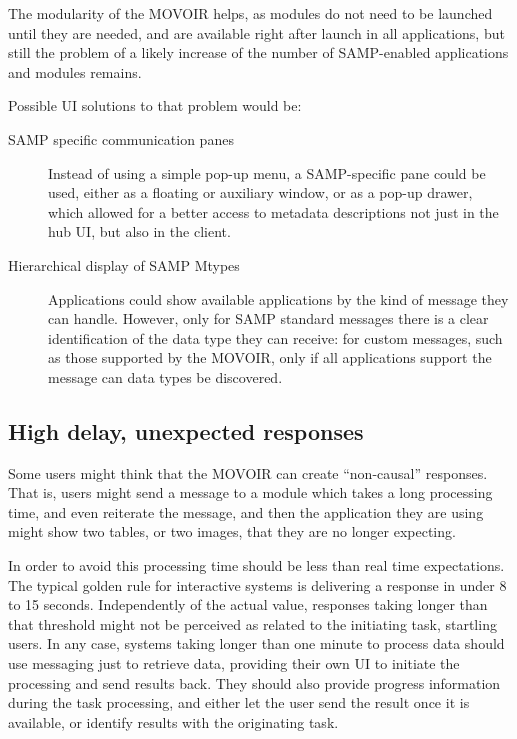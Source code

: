 			 The modularity of the MOVOIR helps, as modules do not
			need to be launched until they are needed, and are
			available right after launch in all applications, but
			still the problem of a likely increase of the number of
			SAMP-enabled applications and modules remains.
			
			Possible UI solutions to that problem would be:
			
			\begin{description}
				\item[SAMP specific communication panes] Instead of
				using a simple pop-up me\-nu, a SAMP-specific pane
				could be used, either as a floating or auxiliary
				window, or as a pop-up drawer, which allowed for
				a better access to metadata descriptions not just
				in the hub UI, but also in the client.
				
				\item[Hierarchical display of SAMP Mtypes]
				Applications could show available applications by
				the kind of message they can handle. However, only
				for SAMP standard messages there is a clear
				identification of the data type they can receive:
				for custom messages, such as those supported by
				the MOVOIR, only if all applications support the
				 message can data
				types be discovered.
			\end{description}
		
		\subsection{High delay, unexpected responses} %
		\label{sub:high_delay_responses}
			Some users might think that the MOVOIR can create
			“non-causal” responses. That is, users might send
			a message to a module which takes a long processing
			time, and even reiterate the message, and then the
			application they are using might show two tables, or
			two images, that they are no longer expecting.
			
			\newcommand{\ariadneurl}
			{http://www.ariadneproject.org/index.php?id=63}
			In order to avoid this processing time should be
			less than real time expectations. The typical golden
			rule for interactive systems is delivering a response
			in under 8 to 15 seconds\urlnote{\ariadneurl}.
			Independently of the actual value, responses taking
			longer than that threshold might not be perceived as
			related to the initiating task, startling users. In
			any case, systems taking longer than one minute to
			process data should use messaging just to retrieve
			data, providing their own UI to initiate the
			processing and send results back. They should also
			provide progress information during the task
			processing, and either let the user send the result
			once it is available, or identify results with the
			originating task.
		
